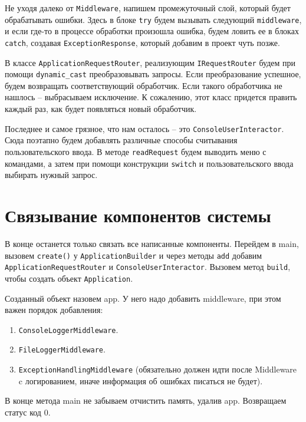 Не уходя далеко от \verb|Middleware|, напишем промежуточный слой, который будет обрабатывать ошибки. Здесь в блоке \verb|try| будем вызывать следующий \verb|middleware|, и если где-то в процессе обработки произошла ошибка, будем ловить ее в блоках \verb|catch|, создавая \verb|ExceptionResponse|, который добавим в проект чуть позже.

В классе \verb|ApplicationRequestRouter|, реализующим \verb|IRequestRouter| будем при помощи \verb|dynamic_cast| преобразовывать запросы. Если преобразование успешное, будем возвращать соответствующий обработчик. Если такого обработчика не нашлось – выбрасываем исключение. К сожалению, этот класс придется править каждый раз, как будет появляться новый обработчик.

Последнее и самое грязное, что нам осталось – это \verb|ConsoleUserInteractor|. Сюда поэтапно будем добавлять различные способы считывания пользовательского ввода. В методе \verb|readRequest| будем выводить меню с командами, а затем при помощи конструкции \verb|switch| и пользовательского ввода выбирать нужный запрос.

\section{Связывание компонентов системы} \label{ch2:sec4}

В конце останется только связать все написанные компоненты. Перейдем в main, вызовем \verb|create()| у \verb|ApplicationBuilder| и через методы \verb|add| добавим \verb|ApplicationRequestRouter| и \verb|ConsoleUserInteractor|. Вызовем метод \verb|build|, чтобы создать объект \verb|Application|.

Созданный объект назовем app. У него надо добавить middleware, при этом важен порядок добавления:

\begin{enumerate}
	\item \verb|ConsoleLoggerMiddleware|.
	\item \verb|FileLoggerMiddleware|.
	\item \verb|ExceptionHandlingMiddleware| (обязательно должен идти после Middleware c логированием, иначе информация об ошибках писаться не будет).
\end{enumerate}

В конце метода main не забываем отчистить память, удалив app. Возвращаем статус код 0.

%
